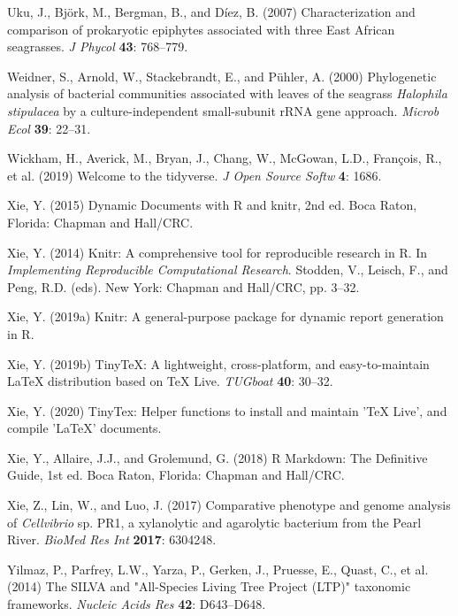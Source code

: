 \documentclass[12pt,]{article}
\begin{document}
\leavevmode\hypertarget{ref-Uku2007}{}%
Uku, J., Björk, M., Bergman, B., and Díez, B. (2007) Characterization
and comparison of prokaryotic epiphytes associated with three East
African seagrasses. \emph{J Phycol} \textbf{43}: 768--779.

\leavevmode\hypertarget{ref-Weidner2000}{}%
Weidner, S., Arnold, W., Stackebrandt, E., and Pühler, A. (2000)
Phylogenetic analysis of bacterial communities associated with leaves of
the seagrass \emph{Halophila stipulacea} by a culture-independent
small-subunit rRNA gene approach. \emph{Microb Ecol} \textbf{39}:
22--31.

\leavevmode\hypertarget{ref-Wickham2019}{}%
Wickham, H., Averick, M., Bryan, J., Chang, W., McGowan, L.D., François,
R., et al. (2019) Welcome to the tidyverse. \emph{J Open Source Softw}
\textbf{4}: 1686.

\leavevmode\hypertarget{ref-Xie2015}{}%
Xie, Y. (2015) Dynamic Documents with R and knitr, 2nd ed. Boca Raton,
Florida: Chapman and Hall/CRC.

\leavevmode\hypertarget{ref-Xie2014}{}%
Xie, Y. (2014) Knitr: A comprehensive tool for reproducible research in
R. In \emph{Implementing Reproducible Computational Research}. Stodden,
V., Leisch, F., and Peng, R.D. (eds). New York: Chapman and Hall/CRC,
pp. 3--32.

\leavevmode\hypertarget{ref-Xie2019}{}%
Xie, Y. (2019a) Knitr: A general-purpose package for dynamic report
generation in R.

\leavevmode\hypertarget{ref-Xie2019a}{}%
Xie, Y. (2019b) TinyTeX: A lightweight, cross-platform, and
easy-to-maintain LaTeX distribution based on TeX Live. \emph{TUGboat}
\textbf{40}: 30--32.

\leavevmode\hypertarget{ref-Xie2020}{}%
Xie, Y. (2020) TinyTex: Helper functions to install and maintain 'TeX
Live', and compile 'LaTeX' documents.

\leavevmode\hypertarget{ref-Xie2018}{}%
Xie, Y., Allaire, J.J., and Grolemund, G. (2018) R Markdown: The
Definitive Guide, 1st ed. Boca Raton, Florida: Chapman and Hall/CRC.

\leavevmode\hypertarget{ref-Xie2017}{}%
Xie, Z., Lin, W., and Luo, J. (2017) Comparative phenotype and genome
analysis of \emph{Cellvibrio} sp. PR1, a xylanolytic and agarolytic
bacterium from the Pearl River. \emph{BioMed Res Int} \textbf{2017}:
6304248.

\leavevmode\hypertarget{ref-Yilmaz2014}{}%
Yilmaz, P., Parfrey, L.W., Yarza, P., Gerken, J., Pruesse, E., Quast,
C., et al. (2014) The SILVA and "All-Species Living Tree Project (LTP)"
taxonomic frameworks. \emph{Nucleic Acids Res} \textbf{42}: D643--D648.
\end{document}
